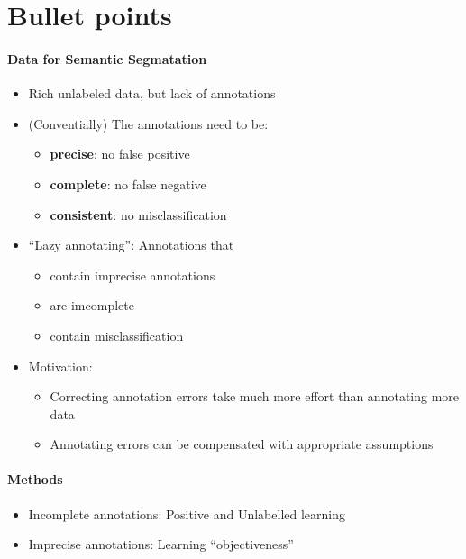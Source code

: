 \section{Bullet points}


\paragraph{Data for Semantic Segmatation}
\begin{itemize}
  \item Rich unlabeled data, but lack of annotations
  \item (Conventially) The annotations need to be:
  \begin{itemize}
    \item \textbf{precise}: no false positive
    \item \textbf{complete}: no false negative
    \item \textbf{consistent}: no misclassification
  \end{itemize}
  \item ``Lazy annotating'': Annotations that
  \begin{itemize}
      \item contain imprecise annotations
      \item are imcomplete
      \item contain misclassification
  \end{itemize}
  \item Motivation:
  \begin{itemize}
    \item Correcting annotation errors take much more effort than annotating more data
    \item Annotating errors can be compensated with appropriate assumptions
  \end{itemize}
\end{itemize}


\paragraph{Methods}
\begin{itemize}
  \item Incomplete annotations: Positive and Unlabelled learning
  \item Imprecise annotations: Learning ``objectiveness''
\end{itemize}
